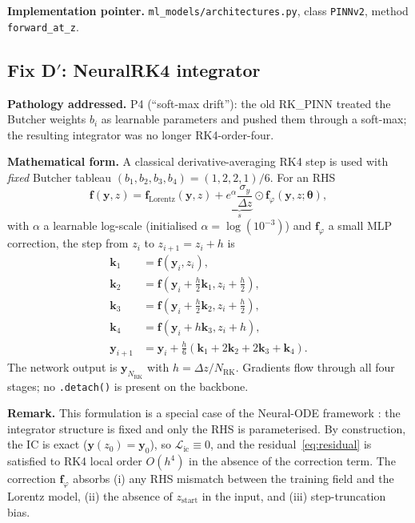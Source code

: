 \documentclass[a4paper,11pt]{article}
\newcommand{\dz}{\Delta z}
\newcommand{\state}{\mathbf{y}}
\newcommand{\loss}{\mathcal{L}}
\newcommand{\btheta}{\bm{\theta}}
\begin{document}
\textbf{Implementation pointer.}
\texttt{ml\_models/architectures.py}, class \texttt{PINNv2}, method
\texttt{forward\_at\_z}.

\subsection{Fix D$'$: NeuralRK4 integrator}

\textbf{Pathology addressed.} P4 (``soft-max drift''): the old
RK\_PINN treated the Butcher weights $b_i$ as learnable parameters and
pushed them through a soft-max; the resulting integrator was no
longer RK4-order-four.

\textbf{Mathematical form.} A classical derivative-averaging RK4
step is used with \emph{fixed} Butcher tableau $(b_1,b_2,b_3,b_4)=
(1,2,2,1)/6$. For an RHS
\begin{equation}
\mathbf{f}(\state,z)=\mathbf{f}_{\mathrm{Lorentz}}(\state,z)
+\underbrace{e^{\alpha}\frac{\sigma_y}{\dz}}_{s}\odot
\mathbf{f}_\varphi(\state,z;\btheta),
\label{eq:rhs}
\end{equation}
with $\alpha$ a learnable log-scale (initialised
$\alpha=\log(10^{-3})$) and $\mathbf{f}_\varphi$ a small MLP
correction, the step from $z_i$ to $z_{i+1}=z_i+h$ is
\begin{align}
\mathbf{k}_1 &= \mathbf{f}(\state_i,z_i),\\
\mathbf{k}_2 &= \mathbf{f}(\state_i+\tfrac{h}{2}\mathbf{k}_1,z_i+\tfrac{h}{2}),\\
\mathbf{k}_3 &= \mathbf{f}(\state_i+\tfrac{h}{2}\mathbf{k}_2,z_i+\tfrac{h}{2}),\\
\mathbf{k}_4 &= \mathbf{f}(\state_i+h\mathbf{k}_3,z_i+h),\\
\state_{i+1} &= \state_i+\frac{h}{6}(\mathbf{k}_1+2\mathbf{k}_2+2\mathbf{k}_3+\mathbf{k}_4).
\end{align}
The network output is $\state_{N_{\mathrm{RK}}}$ with
$h=\dz/N_{\mathrm{RK}}$. Gradients flow through all four stages; no
\texttt{.detach()} is present on the backbone.

\textbf{Remark.} This formulation is a special case of the Neural-ODE
framework \cite{ChenNeuralODE2018}: the integrator structure is fixed
and only the RHS is parameterised. By construction, the IC is exact
($\state(z_0)=\state_0$), so $\loss_{\mathrm{ic}}\equiv 0$, and the
residual~\eqref{eq:residual} is satisfied to RK4 local order $O(h^4)$
in the absence of the correction term. The correction
$\mathbf{f}_\varphi$ absorbs (i) any RHS mismatch between the
training field and the Lorentz model, (ii) the absence of
$z_{\mathrm{start}}$ in the input, and (iii) step-truncation bias.
\end{document}
